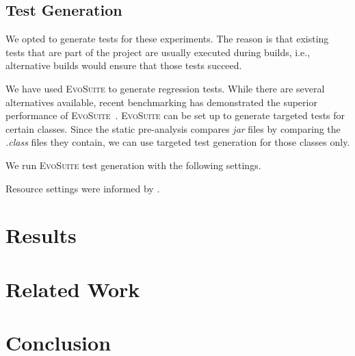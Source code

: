 \documentclass[conference]{IEEEtran}
\makeatletter
\newcommand{\evosuite}{\textsc{EvoSuite}\@\xspace}
\makeatother
\begin{document}
\subsection{Test Generation}

We opted to generate tests for these experiments. The reason is that existing tests that are part of the project are usually executed during builds, i.e., alternative builds would ensure that those tests succeed. 


We have used \evosuite to generate regression tests. While there are several alternatives available, recent benchmarking has demonstrated the superior performance of \evosuite~\cite{jahangirova2023sbft}. \evosuite can be set up to generate targeted tests for certain classes. Since the static pre-analysis compares \textit{jar} files by comparing the \textit{.class} files they contain, we can use targeted test generation for those classes only.   


We run \evosuite test generation with the following settings. 



Resource settings were informed by \cite{jahangirova2023sbft}. 



\section{Results}


\section{Related Work}


\section{Conclusion}











\end{document}
